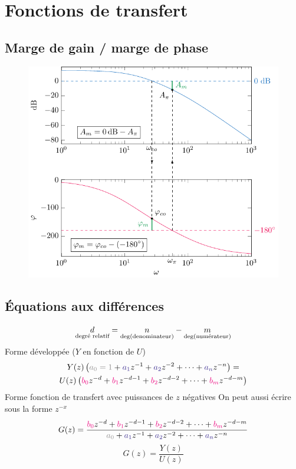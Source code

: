 \documentclass[resume]{subfiles}
\begin{document}
\section{Fonctions de transfert}
\subsection{Marge de gain / marge de phase}
\begin{figure}[H]
\centering
\includegraphics[width=\columnwidth]{drwg_4.pdf}
\end{figure}
\subsection{Équations aux différences}
\label{sec_eq_diff}
$$\LARGE \underset{\text{degré relatif}}{d}=\underset{\deg(\text{denominateur})}{n}-\underset{\deg(\text{numérateur})}{m}$$
Forme développée ($Y$ en fonction de $U$)
\begin{multline*}
Y(z)\left(\textcolor{Gray}{a_0=1}+\acolor{a_1}z^{-1}+\acolor{a_2}z^{-2}+\cdots+\acolor{a_n}z^{-n}\right)=\\U(z)\left(\bcolor{b_0}z^{-d}+\bcolor{b_1}z^{-d-1}+\bcolor{b_2}z^{-d-2}+\cdots+\bcolor{b_m}z^{-d-m}\right)
\end{multline*}
Forme fonction de transfert avec puissances de $z$ négatives
On peut aussi écrire sous la forme $z^{-x}$
$$G(z)=\frac{\bcolor{b_0}z^{-d}+\bcolor{b_1}z^{-d-1}+\bcolor{b_2}z^{-d-2}+\cdots+\bcolor{b_m}z^{-d-m}}{\textcolor{Gray}{a_0}+\acolor{a_1}z^{-1}+\acolor{a_2}z^{-2}+\cdots+\acolor{a_n}z^{-n}}$$
$$G(z)=\frac{Y(z)}{U(z)}$$
\end{document}
